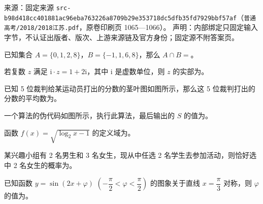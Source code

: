 
\begin{gktip}
来源：固定来源 \texttt{src-b98d418cc401881ac96eba763226a8709b29e353718dc5dfb35fd7929bbf57af}（\texttt{普通高考/2018/2018江苏.pdf}，原卷印刷页 1065—1066）。
声明：内部绑定只固定输入字节，不认证出版者、版次、上游来源链及官方身份；固定源不附答案页。
\end{gktip}

\par\medskip


\begin{question}
已知集合 $A = \{0, 1, 2, 8\}$，$B = \{-1, 1, 6, 8\}$，那么 $A \cap B =$\gkblank{}。

\end{question}
\begin{question}
若复数 $z$ 满足 $\mathrm{i} \cdot z = 1 + 2\mathrm{i}$，其中 $\mathrm{i}$ 是虚数单位，则 $z$ 的实部为\gkblank{}。

\Needspace{0.4\textheight}
\end{question}
\begin{question}
已知 5 位裁判给某运动员打出的分数的茎叶图如图所示，那么这 5 位裁判打出的分数的平均数为\gkblank{}。
\nopagebreak[4]
\begin{center}\end{center}
\nopagebreak[4]
\Needspace{0.4\textheight}
\end{question}
\begin{question}
一个算法的伪代码如图所示，执行此算法，最后输出的 $S$ 的值为\gkblank{}。
\nopagebreak[4]
\begin{center}\end{center}
\nopagebreak[4]
\end{question}
\begin{question}
函数 $f(x) = \sqrt{\log_2 x - 1}$ 的定义域为\gkblank{}。

\end{question}
\begin{question}
某兴趣小组有 2 名男生和 3 名女生，现从中任选 2 名学生去参加活动，则恰好选中 2 名女生的概率为\gkblank{}。

\end{question}
\begin{question}
已知函数 $y = \sin(2x + \varphi)$ $\left(-\dfrac{\pi}{2} < \varphi < \dfrac{\pi}{2}\right)$ 的图象关于直线 $x = \dfrac{\pi}{3}$ 对称，则 $\varphi$ 的值为\gkblank{}。

\end{question}
